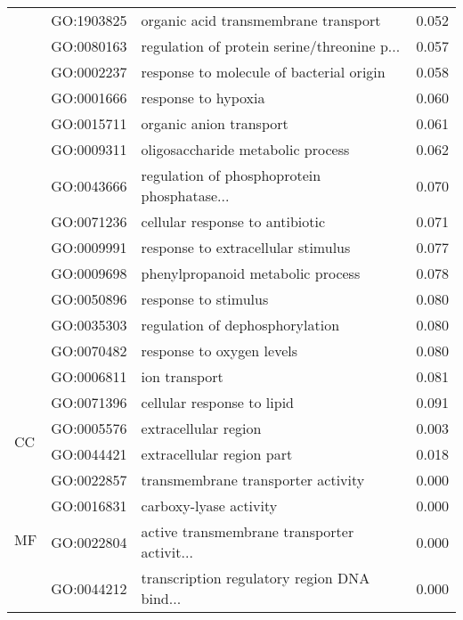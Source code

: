 \begin{longtable}{lllr}
   & GO:1903825 &         organic acid transmembrane transport &         0.052 \\
   & GO:0080163 &  regulation of protein serine/threonine p... &         0.057 \\
   & GO:0002237 &     response to molecule of bacterial origin &         0.058 \\
   & GO:0001666 &                          response to hypoxia &         0.060 \\
   & GO:0015711 &                      organic anion transport &         0.061 \\
   & GO:0009311 &            oligosaccharide metabolic process &         0.062 \\
   & GO:0043666 &  regulation of phosphoprotein phosphatase... &         0.070 \\
   & GO:0071236 &              cellular response to antibiotic &         0.071 \\
   & GO:0009991 &           response to extracellular stimulus &         0.077 \\
   & GO:0009698 &            phenylpropanoid metabolic process &         0.078 \\
   & GO:0050896 &                         response to stimulus &         0.080 \\
   & GO:0035303 &              regulation of dephosphorylation &         0.080 \\
   & GO:0070482 &                    response to oxygen levels &         0.080 \\
   & GO:0006811 &                                ion transport &         0.081 \\
   & GO:0071396 &                   cellular response to lipid &         0.091 \\
\cline{1-4}
\multirow{2}{*}{CC} & GO:0005576 &                         extracellular region &         0.003 \\
   & GO:0044421 &                    extracellular region part &         0.018 \\
\cline{1-4}
\multirow{42}{*}{MF} & GO:0022857 &           transmembrane transporter activity &         0.000 \\
   & GO:0016831 &                       carboxy-lyase activity &         0.000 \\
   & GO:0022804 &  active transmembrane transporter activit... &         0.000 \\
   & GO:0044212 &  transcription regulatory region DNA bind... &         0.000 \\

\end{longtable}
